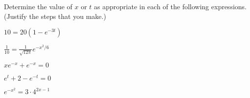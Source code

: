 \begin{problem}
\item Determine the value of $x$ or $t$ as appropriate in each of the
  following expressions. (Justify the steps that you make.)
  \begin{subproblem}
  \item $10 = 20\left( 1 - e^{-3t} \right)$

    \vfill

  \item $\frac{1}{10} =  \frac{1}{\sqrt{12\pi}} e^{-x^2/6}$
    \vfill
  \item $xe^{-x} + e^{-x} = 0$
    \vfill
    \clearpage
  \item $e^{t} + 2 - e^{-t} = 0$
    \vfill
  \item $e^{-x^2} = 3\cdot 4^{2x-1}$
    \vfill
  \end{subproblem}

  \clearpage


\end{problem}
